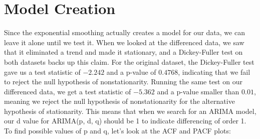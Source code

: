 \documentclass[12pt]{article}
\begin{document}
\section{Model Creation}\label{sec:chapter}
Since the exponential smoothing actually creates a model for our data, we can leave it alone until we test it. When we looked at the differenced data, we saw that it eliminated a trend and made it stationary, and a Dickey-Fuller test on both datasets backs up this claim. For the original dataset, the Dickey-Fuller test gave us a test statistic of \(-2.242\) and a p-value of \(0.4768\), indicating that we fail to reject the null hypothesis of nonstationarity. Running the same test on our differenced data, we get a test statistic of \(-5.362\) and a p-value smaller than \(0.01\), meaning we reject the null hypothesis of nonstationarity for the alternative hypothesis of stationarity. This means that when we search for an ARIMA model, our d value for ARIMA(p, d, q) should be 1 to indicate differencing of order 1. To find possible values of p and q, let's look at the ACF and PACF plots:\\
\end{document}

